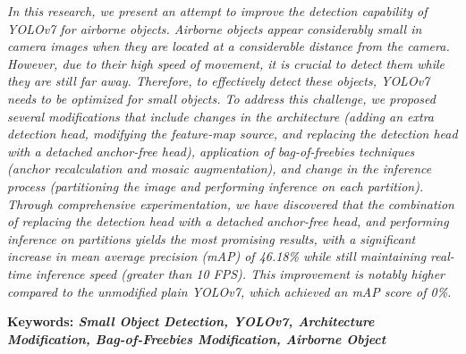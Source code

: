 {
  \itshape
  In this research, we present an attempt to improve the detection capability of YOLOv7 for airborne objects. 
  Airborne objects appear considerably small in camera images when they are located at a considerable distance from the camera. 
  However, due to their high speed of movement, it is crucial to detect them while they are still far away. 
  Therefore, to effectively detect these objects, YOLOv7 needs to be optimized for small objects.
  To address this challenge, we proposed several modifications that include changes in the architecture (adding an extra detection head, modifying the feature-map source, and replacing the detection head with a detached anchor-free head), application of bag-of-freebies techniques (anchor recalculation and mosaic augmentation), and change in the inference process (partitioning the image and performing inference on each partition).
  Through comprehensive experimentation, we have discovered that the combination of replacing the detection head with a detached anchor-free head, and performing inference on partitions yields the most promising results, with a significant increase in mean average precision (mAP) of 46.18\% while still maintaining real-time inference speed (greater than 10 FPS).
  This improvement is notably higher compared to the unmodified plain YOLOv7, which achieved an mAP score of 0\%.
}

\noindent
\textbf{Keywords: \emph{Small Object Detection, YOLOv7, Architecture Modification, Bag-of-Freebies Modification, Airborne Object}}
